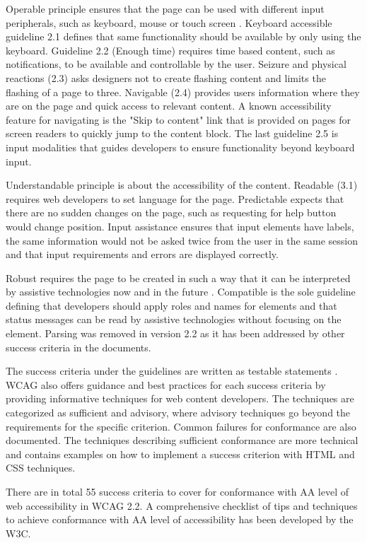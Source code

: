 Operable principle ensures that the page can be used with different input peripherals, such as keyboard, mouse or touch screen \cite{wcag22}. Keyboard accessible guideline 2.1 defines that same functionality should be available by only using the keyboard. Guideline 2.2 (Enough time) requires time based content, such as notifications, to be available and controllable by the user. Seizure and physical reactions (2.3) asks designers not to create flashing content and limits the flashing of a page to three. Navigable (2.4) provides users information where they are on the page and quick access to relevant content. A known accessibility feature for navigating is the "Skip to content" link that is provided on pages for screen readers to quickly jump to the content block. The last guideline 2.5 is input modalities that guides developers to ensure functionality beyond keyboard input.

Understandable principle is about the accessibility of the content. Readable (3.1) requires web developers to set language for the page. Predictable expects that there are no sudden changes on the page, such as requesting for help button would change position. Input assistance ensures that input elements have labels, the same information would not be asked twice from the user in the same session and that input requirements and errors are displayed correctly. 

Robust requires the page to be created in such a way that it can be interpreted by assistive technologies now and in the future \citep{wcag22}. Compatible is the sole guideline defining that developers should apply roles and names for elements and that status messages can be read by assistive technologies without focusing on the element. Parsing was removed in version 2.2 as it has been addressed by other success criteria in the documents.

The success criteria under the guidelines are written as testable statements \citep{wcag22}. WCAG also offers guidance and best practices for each success criteria by providing informative techniques for web content developers. The techniques are categorized as sufficient and advisory, where advisory techniques go beyond the requirements for the specific criterion. Common failures for conformance are also documented. The techniques describing sufficient conformance are more technical and contains examples on how to implement a success criterion with HTML and CSS techniques. 

There are in total 55 success criteria to cover for conformance with AA level of web accessibility in WCAG 2.2. A comprehensive checklist \citep{wcag_checklist} of tips and techniques to achieve conformance with AA level of accessibility has been developed by the W3C.





